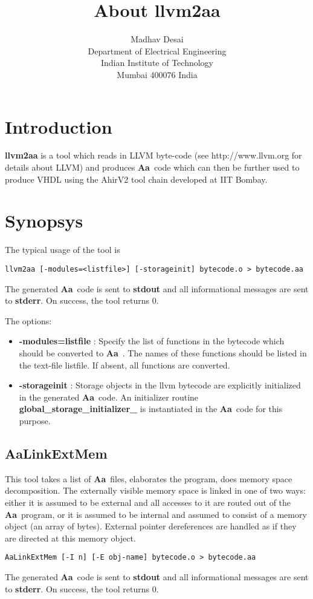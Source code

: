 \documentclass{article}
\title{About {\bf llvm2aa}}
\author{Madhav Desai \\ Department of Electrical Engineering \\ Indian Institute of Technology \\
	Mumbai 400076 India}
\newcommand{\Aa}{{\bf Aa}~}
\begin{document}
\maketitle

\section{Introduction}

{\bf llvm2aa}  is a tool which reads in LLVM byte-code (see http://www.llvm.org for
details about LLVM) and produces \Aa code which can then be further used
to produce VHDL using the AhirV2 tool chain developed at IIT Bombay.

\section{Synopsys}

The typical usage of the tool is 
\begin{verbatim}
llvm2aa [-modules=<listfile>] [-storageinit] bytecode.o > bytecode.aa
\end{verbatim}
The generated \Aa code is sent to {\bf stdout} and all informational
messages are sent to {\bf stderr}.  On success, the tool returns 0.

The options:
\begin{itemize}
\item {\bf -modules=listfile} : Specify the list of functions in the bytecode
which should be converted to \Aa.   The names of these functions should be
listed in the text-file listfile. If absent, all functions
are converted.
\item {\bf -storageinit} :  Storage objects in the llvm bytecode
are explicitly initialized in the generated \Aa code.   An initializer
routine {\bf global\_storage\_initializer\_} is instantiated in
the \Aa code for this purpose.
\end{itemize}

\subsection{{\bf AaLinkExtMem}}

This tool takes a list of \Aa files, elaborates the program,
does memory space decomposition.  The externally visible memory space is
linked in one of two ways: either it is assumed to be external
and all accesses to it are routed out of the \Aa program,
or it is assumed to be internal and assumed to consist of
a memory object (an array of bytes).  External pointer dereferences
are handled as if they are directed at this memory object.
\begin{verbatim}
AaLinkExtMem [-I n] [-E obj-name] bytecode.o > bytecode.aa
\end{verbatim}
The generated \Aa code is sent to {\bf stdout} and all informational
messages are sent to {\bf stderr}.  On success, the tool returns 0.
\end{document}
